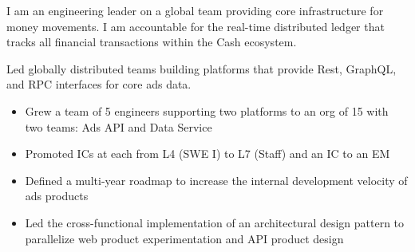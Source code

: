 \documentclass[10pt,a4paper,ragged2e,withhyper]{altacv}
\begin{document}

\makecvheader{}



\begin{paracol}{2}



I am an engineering leader on a global team providing core infrastructure for money
movements. I am accountable for the real-time distributed ledger that tracks all
financial transactions within the Cash ecosystem.


\divider{}


Led globally distributed teams building platforms that provide Rest, GraphQL, and RPC interfaces for core ads data.

\begin{itemize}
\item Grew a team of 5 engineers supporting two platforms to an org of 15 with two teams: Ads API and Data Service
\item Promoted ICs at each from L4 (SWE I) to L7 (Staff) and an IC to an EM
\item Defined a multi-year roadmap to increase the internal development velocity of ads products
\item Led the cross-functional implementation of an architectural design pattern to parallelize web product experimentation and API product design
\end{itemize}



\end{paracol}
\end{document}
